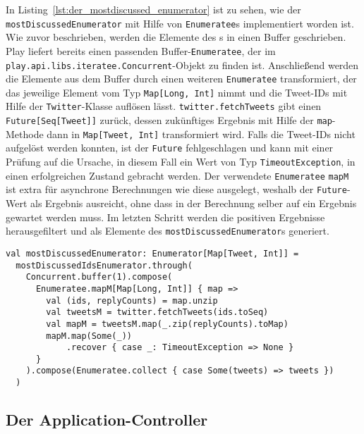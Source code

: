 In Listing~\ref{lst:der_mostdiscussed_enumerator} ist zu sehen, wie der \lstinline|mostDiscussedEnumerator| mit Hilfe von \lstinline|Enumeratee|s implementiert worden ist.
Wie zuvor beschrieben, werden die Elemente des s in einen Buffer geschrieben.
Play liefert bereits einen passenden Buffer-\lstinline|Enumeratee|, der im \lstinline|play.api.libs.iteratee.Concurrent|-Objekt zu finden ist.
Anschließend werden die Elemente aus dem Buffer durch einen weiteren \lstinline|Enumeratee| transformiert, der das jeweilige Element vom Typ \lstinline|Map[Long, Int]| nimmt und die Tweet-IDs mit Hilfe der \lstinline|Twitter|-Klasse auflösen lässt.
\lstinline|twitter.fetchTweets| gibt einen \lstinline|Future[Seq[Tweet]]| zurück, dessen zukünftiges Ergebnis mit Hilfe der \lstinline|map|-Methode dann in \lstinline|Map[Tweet, Int]| transformiert wird.
Falls die Tweet-IDs nicht aufgelöst werden konnten, ist der \lstinline|Future| fehlgeschlagen und kann mit einer Prüfung auf die Ursache, in diesem Fall ein Wert von Typ \lstinline|TimeoutException|, in einen erfolgreichen Zustand gebracht werden.
Der verwendete \lstinline|Enumeratee| \lstinline|mapM| ist extra für asynchrone Berechnungen wie diese ausgelegt, weshalb der \lstinline|Future|-Wert als Ergebnis ausreicht, ohne dass in der Berechnung selber auf ein Ergebnis gewartet werden muss.
Im letzten Schritt werden die positiven Ergebnisse herausgefiltert und als Elemente des \lstinline|mostDiscussedEnumerator|s generiert.

\begin{lstlisting}[caption=Der mostDiscussed-Enumerator, label=lst:der_mostdiscussed_enumerator]
val mostDiscussedEnumerator: Enumerator[Map[Tweet, Int]] =
  mostDiscussedIdsEnumerator.through(
    Concurrent.buffer(1).compose(
      Enumeratee.mapM[Map[Long, Int]] { map =>
        val (ids, replyCounts) = map.unzip
        val tweetsM = twitter.fetchTweets(ids.toSeq)
        val mapM = tweetsM.map(_.zip(replyCounts).toMap)
        mapM.map(Some(_))
            .recover { case _: TimeoutException => None }
      }
    ).compose(Enumeratee.collect { case Some(tweets) => tweets })
  )
\end{lstlisting}



\subsection{Der Application-Controller} %
\label{sub:der_application_controller}

